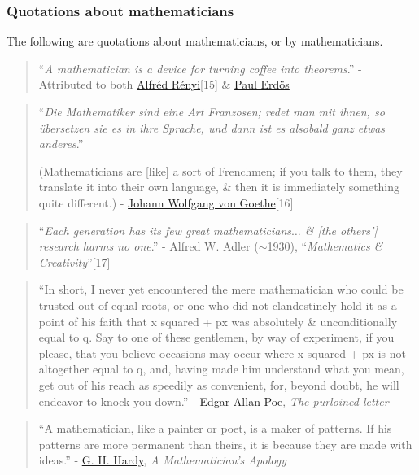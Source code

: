 \documentclass{article}
\begin{document}
\subsubsection{Quotations about mathematicians}
The following are quotations about mathematicians, or by mathematicians.
\begin{quotation}
	``\textit{A mathematician is a device for turning coffee into theorems}.'' - Attributed to both \href{https://en.wikipedia.org/wiki/Alfr%C3%A9d_R%C3%A9nyi}{Alfréd Rényi}[15] \& \href{https://en.wikipedia.org/wiki/Paul_Erd%C5%91s}{Paul Erd\"os}
\end{quotation}

\begin{quotation}
	``\textit{Die Mathematiker sind eine Art Franzosen; redet man mit ihnen, so übersetzen sie es in ihre Sprache, und dann ist es alsobald ganz etwas anderes}.''
	
	(Mathematicians are [like] a sort of Frenchmen; if you talk to them, they translate it into their own language, \& then it is immediately something quite different.) - \href{https://en.wikipedia.org/wiki/Johann_Wolfgang_von_Goethe}{Johann Wolfgang von Goethe}[16]
\end{quotation}

\begin{quotation}
	``\textit{Each generation has its few great mathematicians$\ldots$ \& [the others'] research harms no one}.'' - Alfred W. Adler ($\sim$1930), ``\textit{Mathematics \& Creativity}''[17]
\end{quotation}

\begin{quotation}
	``In short, I never yet encountered the mere mathematician who could be trusted out of equal roots, or one who did not clandestinely hold it as a point of his faith that x squared + px was absolutely \& unconditionally equal to q. Say to one of these gentlemen, by way of experiment, if you please, that you believe occasions may occur where x squared + px is not altogether equal to q, and, having made him understand what you mean, get out of his reach as speedily as convenient, for, beyond doubt, he will endeavor to knock you down.'' - \href{https://en.wikipedia.org/wiki/Edgar_Allan_Poe}{Edgar Allan Poe}, \textit{The purloined letter}
\end{quotation}

\begin{quotation}
	``A mathematician, like a painter or poet, is a maker of patterns. If his patterns are more permanent than theirs, it is because they are made with ideas.'' - \href{https://en.wikipedia.org/wiki/G._H._Hardy}{G. H. Hardy}, \textit{A Mathematician's Apology}
\end{quotation}
\end{document}
